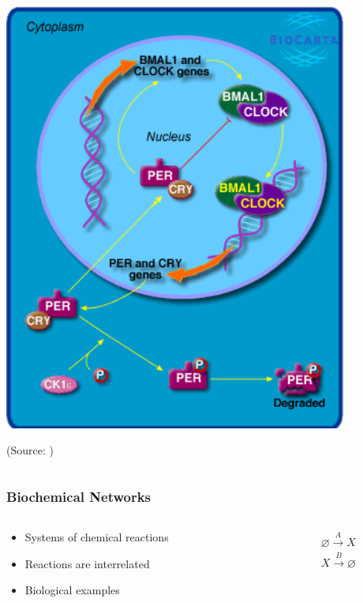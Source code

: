 \documentclass[xcolor={usenames,dvipsnames,svgnames}]{beamer}
\begin{document}
\begin{frame}
\begin{columns}[t]
\begin{column}[T]{0.5\textwidth}
            \includegraphics[width=0.85\textwidth]{h_circadianPathway.png}

            \small (Source: \cite{biocarta})
        \end{column}
    \end{columns}
\end{frame}

\begin{frame}
    \frametitle{Biochemical Networks}
    \begin{columns}[c]
        \begin{column}{0.5\textwidth}
            \begin{itemize}
                \item Systems of chemical reactions
                \item Reactions are interrelated
                \item Biological examples
            \end{itemize}
        \end{column}
        \begin{column}{0.5\textwidth}
            \begin{align*}
                \varnothing \xrightarrow{A} X \\
                X \xrightarrow {B} \varnothing
            \end{align*}
        \end{column}
    \end{columns}
\end{frame}
\end{document}
